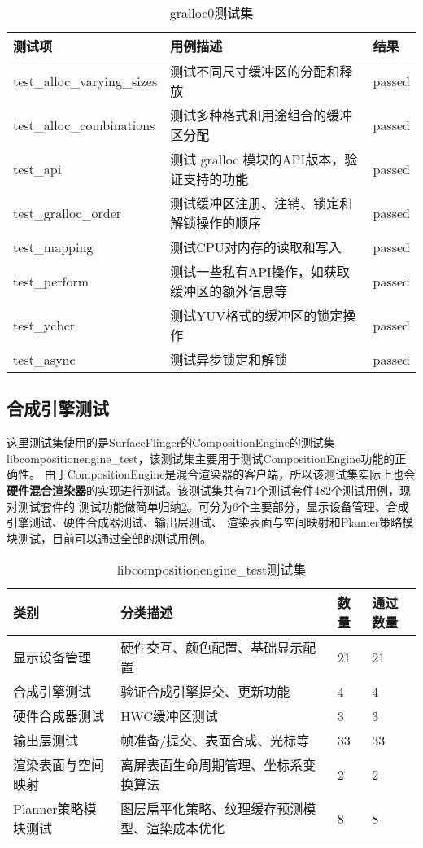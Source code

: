 \begin{table}[H]
    \centering
    \caption{gralloc0测试集}
    \label{tab:gralloc0测试集}
    \begin{tabular}{lll}
      \toprule
      测试项 & 用例描述 & 结果 \\
      \midrule
      test\_alloc\_varying\_sizes & 测试不同尺寸缓冲区的分配和释放 & passed\\
      test\_alloc\_combinations & 测试多种格式和用途组合的缓冲区分配 & passed\\
      test\_api & 测试 gralloc 模块的API版本，验证支持的功能 & passed\\
      test\_gralloc\_order & 测试缓冲区注册、注销、锁定和解锁操作的顺序 & passed\\
      test\_mapping & 测试CPU对内存的读取和写入 & passed\\
      test\_perform & 测试一些私有API操作，如获取缓冲区的额外信息等 & passed\\
      test\_ycbcr & 测试YUV格式的缓冲区的锁定操作 & passed\\
      test\_async & 测试异步锁定和解锁 & passed\\
      \bottomrule
    \end{tabular}
    \note{}
\end{table}

\subsection{合成引擎测试}
\label{sec:合成引擎正确性测试}

这里测试集使用的是SurfaceFlinger的CompositionEngine的测试集libcompositionengine\_test，该测试集主要用于测试CompositionEngine功能的正确性。
由于CompositionEngine是混合渲染器的客户端，所以该测试集实际上也会\textbf{硬件混合渲染器}的实现进行测试。该测试集共有71个测试套件482个测试用例，现对测试套件的
测试功能做简单归纳\ref{tab:libcompositionengine_test测试集}。可分为6个主要部分，显示设备管理、合成引擎测试、硬件合成器测试、输出层测试、
渲染表面与空间映射和Planner策略模块测试，目前可以通过全部的测试用例。

\begin{table}[H]
    \centering
    \caption{libcompositionengine\_test测试集}
    \label{tab:libcompositionengine_test测试集}
    \begin{tabular}{llll}
      \toprule
      类别 &  分类描述 & 数量 & 通过数量\\
      \midrule
      显示设备管理 & 硬件交互、颜色配置、基础显示配置 & 21 & 21\\
      合成引擎测试 & 验证合成引擎提交、更新功能 & 4 & 4\\
      硬件合成器测试 & HWC缓冲区测试 & 3 & 3\\
      输出层测试 & 帧准备/提交、表面合成、光标等  & 33 & 33\\
      渲染表面与空间映射 & 	离屏表面生命周期管理、坐标系变换算法 & 2 & 2\\
      Planner策略模块测试 & 图层扁平化策略、纹理缓存预测模型、渲染成本优化 & 8 & 8\\
      \bottomrule
    \end{tabular}
    \note{}
\end{table}

